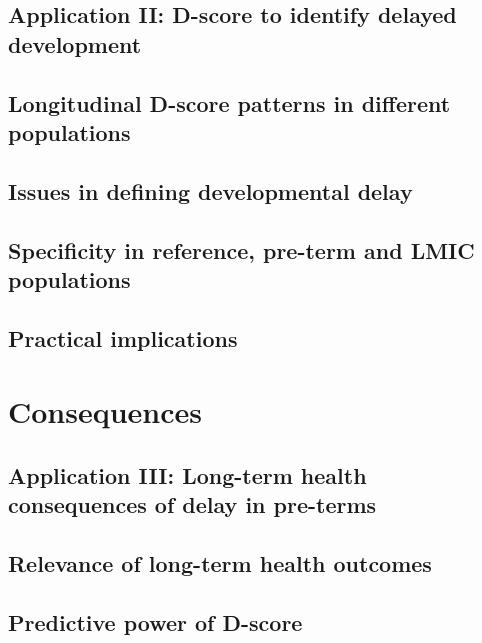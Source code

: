\documentclass[]{book}
\begin{document}
\section{Application II: D-score to identify delayed
development}\label{application-ii-d-score-to-identify-delayed-development}

\section{Longitudinal D-score patterns in different
populations}\label{longitudinal-d-score-patterns-in-different-populations}

\section{Issues in defining developmental
delay}\label{issues-in-defining-developmental-delay}

\section{Specificity in reference, pre-term and LMIC
populations}\label{specificity-in-reference-pre-term-and-lmic-populations}

\section{Practical implications}\label{practical-implications}

\chapter{Consequences}\label{consequences}

\section{Application III: Long-term health consequences of delay in
pre-terms}\label{application-iii-long-term-health-consequences-of-delay-in-pre-terms}

\section{Relevance of long-term health
outcomes}\label{relevance-of-long-term-health-outcomes}

\section{Predictive power of D-score}\label{predictive-power-of-d-score}
\end{document}
